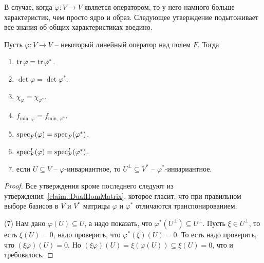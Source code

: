 В случае, когда $\varphi\colon V\to V$ является оператором, то у него намного больше характеристик, чем просто ядро и образ. Следующее утверждение подытоживает все знания об общих характеристиках воедино.

\begin{claim}
Пусть $\varphi\colon V\to V$ -- некоторый линейный оператор над полем $F$. Тогда
\begin{enumerate}
\item $\operatorname{tr} \varphi = \operatorname{tr} \varphi^*$.

\item $\det \varphi = \det \varphi^*$.

\item $\chi_\varphi = \chi_{\varphi^*}$.

\item $f_{\text{min},\,\varphi} = f_{\text{min},\,\varphi^*}$.

\item $\operatorname{spec}_F(\varphi) = \operatorname{spec}_F(\varphi^*)$.

\item $\operatorname{spec}_F^I(\varphi) = \operatorname{spec}_F^I(\varphi^*)$.

\item если $U\subseteq V$ -- $\varphi$-инвариантное, то $U^\bot\subseteq V^*$ -- $\varphi^*$-инвариантное.
\end{enumerate}
\end{claim}
\begin{proof}
Все утверждения кроме последнего следуют из утверждения~\ref{claim::DualHomMatrix}, которое гласит, что при правильном выборе базисов в $V$ и $V^*$ матрицы $\varphi$ и $\varphi^*$ отличаются транспонированием.

(7) Нам дано $\varphi(U)\subseteq U$, а надо показать, что $\varphi^*(U^\bot)\subseteq U^\bot$. Пусть $\xi\in U^\bot$, то есть $\xi(U) = 0$, надо проверить, что $\varphi^*(\xi)(U) = 0$. То есть надо проверить, что $(\xi \varphi)(U) = 0$. Но $(\xi \varphi) (U) = \xi(\varphi(U))\subseteq \xi(U) = 0$, что и требовалось.
\end{proof}


